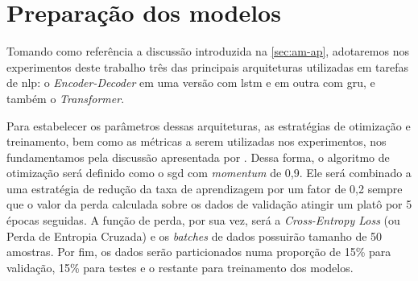 \section{Preparação dos modelos}
\label{sec:metodos-preparacao-modelos}






Tomando como referência a discussão introduzida na \autoref{sec:am-ap}, adotaremos nos experimentos deste trabalho três das principais arquiteturas utilizadas em tarefas de \acrfull{nlp}: o \textit{Encoder-Decoder} em uma versão com \acrfull{lstm} e em outra com \acrfull{gru}, e também o \textit{Transformer}.


Para estabelecer os parâmetros dessas arquiteturas, as estratégias de otimização e treinamento, bem como as métricas a serem utilizadas nos experimentos, nos fundamentamos pela discussão apresentada por .
Dessa forma, o algoritmo de otimização será definido como o \acrfull{sgd} com \textit{momentum} de 0,9. Ele será combinado a uma estratégia de redução da taxa de aprendizagem por um fator de 0,2 sempre que o valor da perda calculada sobre os dados de validação atingir um platô por 5 épocas seguidas. A função de perda, por sua vez, será a \textit{Cross-Entropy Loss} (ou Perda de Entropia Cruzada) e os \textit{batches} de dados possuirão tamanho de 50 amostras. Por fim, os dados serão particionados numa proporção de 15\% para validação, 15\% para testes e o restante para treinamento dos modelos.


